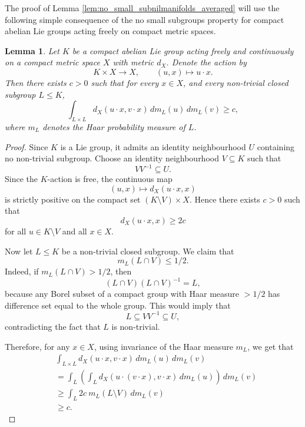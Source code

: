 \documentclass[12pt]{amsart}
\theoremstyle{plain}
\newtheorem{lemma}[theorem]{Lemma}
\theoremstyle{definition}
\begin{document}
The proof of Lemma \ref{lem:no_small_subnilmanifolds_averaged} will use the following simple consequence of the no small subgroups property for compact abelian Lie groups acting freely on compact metric spaces. 

\begin{lemma} \label{lem:no_small_subgroups_averaged}
    Let $K$ be a compact abelian Lie group acting freely and continuously on a compact metric space $X$ with metric $d_X$.
    Denote the action by 
    \[
    K \times X \to X, \qquad (u, x) \mapsto u \cdot  x.
    \]
    Then there exists $c > 0$ such that for every $x \in X$, and every non-trivial closed subgroup $L \leq K$, 
    \[
    \int_{L \times L} d_X(u \cdot x, v \cdot x) \,d m_L(u) \,d m_L(v) \geq c,
    \]
    where $m_L$ denotes the Haar probability measure of $L$.
\end{lemma}

\begin{proof}
    Since $K$ is a Lie group, it admits an identity neighbourhood $U$ containing no non-trivial subgroup. 
    Choose an identity neighbourhood $V \subseteq K$ such that 
    \[
    V V^{-1} \subseteq U. 
    \]
    Since the $K$-action is free, the continuous map
    \[
    (u,x) \mapsto d_X(u \cdot x, x)
    \]
    is strictly positive on the compact set $(K \setminus V) \times X$.
    Hence there exists $c > 0$ such that 
    \[
    d_X (u \cdot x, x) \geq 2 c
    \]
    for all $u \in K \setminus V$ and all $x \in X$.

    Now let $L \leq K$ be a non-trivial closed subgroup.
    We claim that 
    \[
    m_L(L \cap V) \leq 1/2.
    \]
    Indeed, if $m_L(L \cap V) > 1/2$, then 
    \[
    (L \cap V) (L \cap V)^{-1} = L,
    \]
    because any Borel subset of a compact group with Haar measure $> 1/2$ has difference set equal to the whole group. 
    This would imply that 
    \[
    L \subseteq V V^{-1} \subseteq U,
    \]
    contradicting the fact that $L$ is non-trivial.

    Therefore, for any $x \in X$, using invariance of the Haar measure $m_L$, we get that  
    \begin{align*}
        &\int_{L \times L} d_X(u \cdot x, v \cdot x) \,d m_L(u) \,d m_L(v) \\
        &= \int_L \left(
        \int_L d_X(u \cdot (v \cdot x), v \cdot x) \,d m_L(u) \right) \,d m_L(v) \\
        &\geq \int_L 2c \ m_L(L \setminus V) \,d m_L(v) \\
        &\geq c.
    \end{align*} 
\end{proof}
\end{document}

